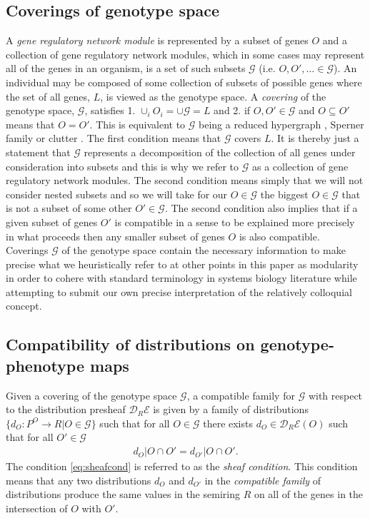 \subsection{Coverings of genotype space}
A \emph{gene regulatory network module} is represented by a subset of genes $O$ and a collection of gene regulatory network modules, which in some cases may represent all of the genes in an organism, is a set of such subsets $\mathcal{G}$ (i.e. $O,O',\ldots \in \mathcal{G}$). An individual may be composed of some collection of subsets of possible genes where the set of all genes, $L$, is viewed as the genotype space. A \emph{covering} of the genotype space, $\mathcal{G}$, satisfies 1. $\cup_i O_i = \cup \mathcal{G} = L$ and 2. if $O,O' \in \mathcal{G}$ and $O \subseteq O'$ means that $O = O'$. This is equivalent to $\mathcal{G}$ being a reduced hypergraph , Sperner family or clutter \cite{Lauritzen1996}. The first condition means that $\mathcal{G}$ covers $L$. It is thereby just a statement that $\mathcal{G}$ represents a decomposition of the collection of all genes under consideration into subsets and this is why we refer to $\mathcal{G}$ as a collection of gene regulatory network modules. The second condition means simply that we will not consider nested subsets and so we will take for our $O \in \mathcal{G}$ the biggest $O \in \mathcal{G}$ that is not a subset of some other $O' \in \mathcal{G}$. The second condition also implies that if a given subset of genes $O'$ is compatible in a sense to be explained more precisely in what proceeds then any smaller subset of genes $O$ is also compatible. Coverings $\mathcal{G}$ of the genotype space contain the necessary information to make precise what we heuristically refer to at other points in this paper as modularity in order to cohere with standard terminology in systems biology literature while attempting to submit our own precise interpretation of the relatively colloquial concept.

\subsection{Compatibility of distributions on genotype-phenotype maps}
Given a covering of the genotype space $\mathcal{G}$, a compatible family for $\mathcal{G}$ with respect to the distribution presheaf $\mathcal{D}_R\mathcal{E}$ is given by a family of distributions $\{d_O \colon P^O \rightarrow R | O \in \mathcal{G}\}$ such that for all $O \in \mathcal{G}$ there exists $d_O \in \mathcal{D}_R\mathcal{E}(O)$ such that for all $O' \in \mathcal{G}$
\begin{eqnarray}\label{eq:sheafcond}
d_O|O \cap O' = d_{O'}|O \cap O'.
\end{eqnarray}
The condition \ref{eq:sheafcond} is referred to as the \emph{sheaf condition}. This condition means that any two distributions $d_O$ and $d_{O'}$ in the \emph{compatible family} of distributions produce the same values in the semiring $R$ on all of the genes in the intersection of $O$ with $O'$.

